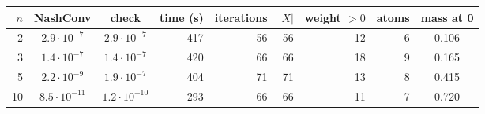 \begin{tabular}{rccrrrrrc}
\toprule
$n$ & NashConv & check & time (s) & iterations & $|X|$ & weight $>0$ & atoms & mass at 0 \\
\midrule
2 & $2.9\cdot10^{-7}$ & $2.9\cdot10^{-7}$ & 417 & 56 & 56 & 12 & 6 & 0.106 \\
3 & $1.4\cdot10^{-7}$ & $1.4\cdot10^{-7}$ & 420 & 66 & 66 & 18 & 9 & 0.165 \\
5 & $2.2\cdot10^{-9}$ & $1.9\cdot10^{-7}$ & 404 & 71 & 71 & 13 & 8 & 0.415 \\
10 & $8.5\cdot10^{-11}$ & $1.2\cdot10^{-10}$ & 293 & 66 & 66 & 11 & 7 & 0.720 \\
\bottomrule
\end{tabular}
